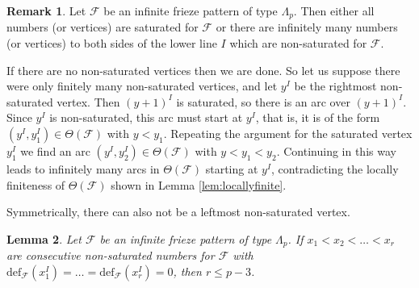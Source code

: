 \documentclass[11pt,a4paper]{amsart}
\newtheorem{Lemma}{Lemma}[section]
\theoremstyle{definition}
\newtheorem{Remark}[Lemma]{Remark}
\numberwithin{equation}{section}
\begin{document}
\begin{Remark} \label{rem:infnonsat}
Let $\mathcal{F}$ be an infinite frieze pattern of type $\Lambda_p$. Then either all numbers (or vertices)
are saturated for $\mathcal{F}$ 
or there are infinitely many numbers (or vertices)  to both sides of the lower line $I$ which are 
non-saturated for $\mathcal {F}$.
\smallskip

If there are no non-saturated vertices then we are done. So let  
us suppose there were only finitely many non-saturated vertices, and let $y^I$ be the rightmost 
non-saturated vertex. Then $(y+1)^I$ is saturated, so there is an arc over $(y+1)^I$. Since $y^I$ is non-saturated,
this arc must start at $y^I$, that is, it is of the form $(y^I,y_1^I)\in \Theta(\mathcal{F})$ with $y<y_1$. 
Repeating the argument for the saturated vertex $y_1^I$ we find an arc $(y^I,y_2^I)\in \Theta(\mathcal{F})$ 
with $y<y_1<y_2$. Continuing in this way leads to infinitely many arcs in $\Theta(\mathcal{F})$
starting at $y^I$, contradicting the locally finiteness of $\Theta(\mathcal{F})$ shown in Lemma 
\ref{lem:locallyfinite}.

Symmetrically, there can also not be a leftmost non-saturated vertex. 
\end{Remark}

\begin{Lemma} \label{lem:consecutive}
Let $\mathcal{F}$ be an infinite frieze pattern of type $\Lambda_p$. If $x_1<x_2<\ldots <x_r$ are 
consecutive non-saturated numbers for $\mathcal{F}$ with 
$\mathrm{def}_{\mathcal{F}}(x_1^I)=\ldots=\mathrm{def}_{\mathcal{F}}(x_r^I)=0$, then
$r\le p-3$. 
\end{Lemma}
\end{document}
